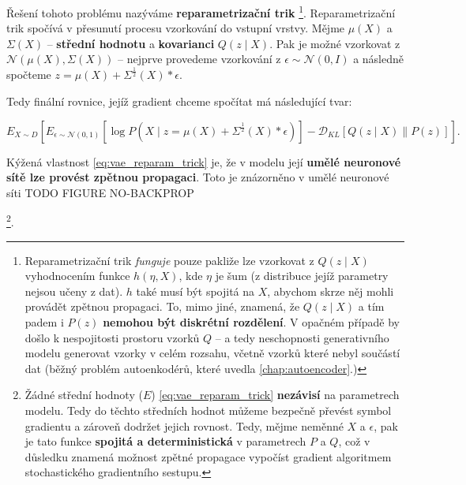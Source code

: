Řešení tohoto problému nazýváme \textbf{reparametrizační trik}
\footnote{Reparametrizační trik \emph{funguje} pouze pakliže lze vzorkovat z $Q(z\mid X)$ vyhodnocením funkce $h(\eta, X)$, kde $\eta$ je šum (z distribuce jejíž parametry nejsou učeny z dat). $h$ také musí být spojitá na $X$, abychom skrze něj mohli provádět zpětnou propagaci.
To, mimo jiné, znamená, že $Q(z\mid X)$ a tím padem i $P(z)$ \textbf{nemohou být diskrétní rozdělení}. V opačném případě by došlo k nespojitosti prostoru vzorků $Q$ – a tedy neschopnosti generativního modelu generovat vzorky v celém rozsahu, včetně vzorků které nebyl součástí dat (běžný problém autoenkodérů, které uvedla \autoref{chap:autoencoder}.)}.
Reparametrizační trik spočívá v přesunutí procesu vzorkování do vstupní vrstvy.
Mějme $\mu(X)$ a $\Sigma(X)$ – \textbf{střední hodnotu} a \textbf{kovarianci} $Q(z\mid X)$.
Pak je možné vzorkovat z $\mathcal{N}(\mu(X), \Sigma(X))$ – nejprve provedeme vzorkování z $\epsilon \sim \mathcal{N}(0, I)$ a následně spočteme $z = \mu(X) + \Sigma^{\frac{1}{2}}(X) * \epsilon$.

Tedy finální rovnice, jejíž gradient chceme spočítat má následující tvar:

\begin{equation} \label{eq:vae_reparam_trick}
    E_{X \sim D} \left[ E_{\epsilon \sim \mathcal{N}(0, 1)} \left[ \log P(X\mid z = \mu(X) + \Sigma^{\frac{1}{2}} (X) * \epsilon) \right] - \mathcal{D}_{KL} \left[ Q (z \mid X) \parallel P(z) \right] \right].
\end{equation}

Kýžená vlastnost \autoref{eq:vae_reparam_trick} je, že v modelu její \textbf{umělé neuronové sítě lze provést zpětnou propagaci}. 
Toto je znázorněno v umělé neuronové síti TODO FIGURE NO-BACKPROP 

\footnote{Žádné střední hodnoty ($E$) \autoref{eq:vae_reparam_trick} \textbf{nezávisí} na parametrech modelu. Tedy do těchto středních hodnot můžeme bezpečně převést symbol gradientu a zároveň dodržet jejich rovnost. 
Tedy, mějme neměnné $X$ a $\epsilon$, pak je tato funkce \textbf{spojitá a deterministická} v parametrech $P$ a $Q$, což v důsledku znamená možnost zpětné propagace vypočíst gradient algoritmem stochastického gradientního sestupu. }. 